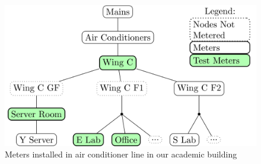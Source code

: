 \begin{figure} 
	\centering
	\includegraphics[width=1\linewidth]{tikz/tree}
	\caption[Meters installed in air conditioner line in our academic building]{Meters installed in air conditioner line in our academic building}
	\label{fig:tree}
	\vspace*{-3ex}
\end{figure}
